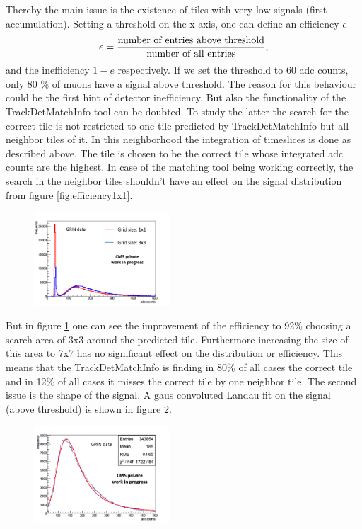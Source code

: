 			Thereby the main issue is the existence of tiles with very low signals (first accumulation).
			Setting a threshold on the x axis, one can define an efficiency $e$
			\begin{equation}
				e = \frac{\textnormal{number of entries above threshold}}{\textnormal{number of all entries}},
			\end{equation}
			and the inefficiency $1-e$ respectively.
			If we set the threshold to 60 adc counts, only 80 \% of muons have a signal above threshold.
			The reason for this behaviour could be the first hint of detector inefficiency.
			But also the functionality of the TrackDetMatchInfo tool can be doubted.
			To study the latter the search for the correct tile is not restricted to one tile predicted by TrackDetMatchInfo but all neighbor tiles of it.
			In this neighborhood the integration of timeslices is done as described above.
			The tile is chosen to be the correct tile whose integrated adc counts are the highest.
			In case of the matching tool being working correctly, the search in the neighbor tiles shouldn't have an effect on the signal distribution from figure \ref{fig:efficiency1x1}.
			\begin{figure}[htbp]
				\centering
				\includegraphics[width=0.45\textwidth]{Figures/erdogan/neighborhood.png}
				\caption{}
				\label{fig:neighborhood}
			\end{figure}
			But in figure \ref{fig:neighborhood} one can see the improvement of the efficiency to 92\% choosing a search area of 3x3 around the predicted tile.
			Furthermore increasing the size of this area to 7x7 has no significant effect on the distribution or efficiency.
			This means that the TrackDetMatchInfo is finding in 80\% of all cases the correct tile and in 12\% of all cases it misses the correct tile by one neighbor tile.
			The second issue is the shape of the signal.
			A gaus convoluted Landau fit on the signal (above threshold) is shown in figure \ref{fig:langaus_bad}.
			\begin{figure}[htbp]
				\centering
				\includegraphics[width=0.45\textwidth]{Figures/erdogan/langaus_bad.png}
				\caption{}
				\label{fig:langaus_bad}
			\end{figure}
